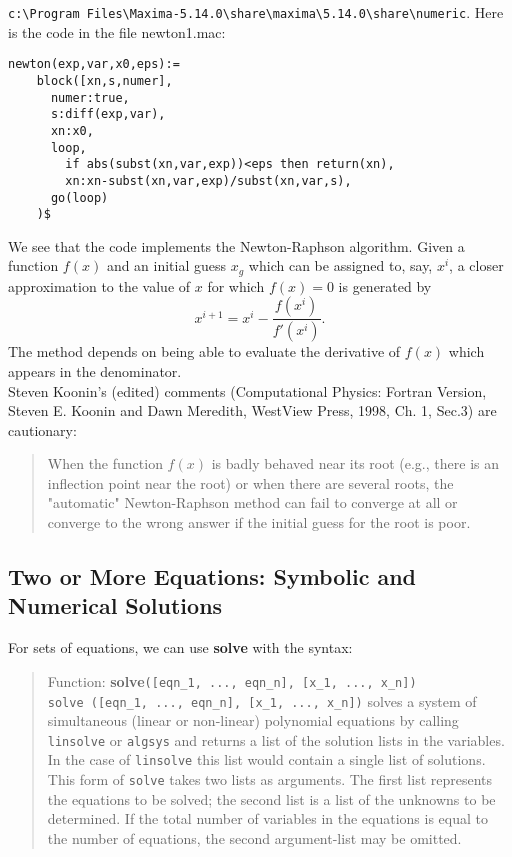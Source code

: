 \documentclass[12pt]{article}
\begin{document}
\verb|c:\Program Files\Maxima-5.14.0\share\maxima\5.14.0\share\numeric|.
Here is the code in the file newton1.mac:
\small
\begin{verbatim}
newton(exp,var,x0,eps):=
    block([xn,s,numer],
      numer:true,
      s:diff(exp,var),
      xn:x0,
      loop,
        if abs(subst(xn,var,exp))<eps then return(xn),
        xn:xn-subst(xn,var,exp)/subst(xn,var,s),
      go(loop)
    )$
\end{verbatim}
\normalsize
We see that the code implements the Newton-Raphson algorithm.
Given a function $f(x)$ and an initial guess $x_{g}$ which can be assigned
  to, say, $x^{i}$, a closer approximation to the value of $x$ for which
  $f(x)=0$ is generated by
  $$ x^{i+1} = x^{i} - \frac{f(x^{i})}{f'(x^{i}) }. $$
The method depends on being able to evaluate the derivative of $f(x)$ which
  appears in the denominator.\\
Steven Koonin's (edited) comments (Computational Physics: Fortran Version, Steven E. Koonin and Dawn Meredith,
   WestView Press, 1998, Ch. 1, Sec.3) are cautionary:
\small
\begin{quote}
When the function $f(x)$ is badly behaved near its root (e.g., there is an inflection
  point near the root) or when there are several roots, the "automatic" Newton-Raphson
   method can fail to converge at all or converge to the wrong answer if the initial
   guess for the root is poor.
\end{quote}
\normalsize

  
  
\newpage
  
\subsection{Two or More Equations: Symbolic and Numerical Solutions}
For sets of equations, we can use \textbf{solve} with the syntax:

\small
\begin{quote}
Function: \textbf{solve}\verb|([eqn_1, ..., eqn_n], [x_1, ..., x_n]) |\\
\verb|solve ([eqn_1, ..., eqn_n], [x_1, ..., x_n])| solves a system of simultaneous
  (linear or non-linear) polynomial equations by calling \verb|linsolve| or
  \verb|algsys| and returns a list of the solution lists in the variables.
In the case of \verb|linsolve| this list would contain a single list of solutions.
This form of \verb|solve| takes two lists as arguments.
The first list represents the equations to be solved; the second list
   is a list of the unknowns to be determined.
If the total number of variables in the equations is equal to the number
  of equations, the second argument-list may be omitted.
\end{quote}
\normalsize
\end{document}
